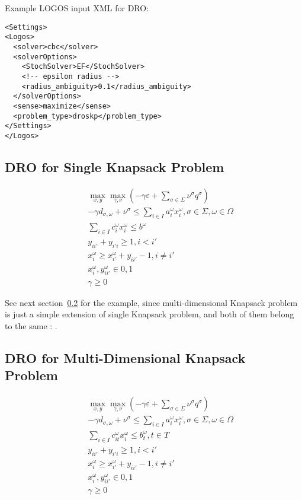 Example LOGOS input XML for DRO:
\begin{lstlisting}[style=XML]
<Settings>
<Logos>
  <solver>cbc</solver>
  <solverOptions>
    <StochSolver>EF</StochSolver>
    <!-- epsilon radius -->
    <radius_ambiguity>0.1</radius_ambiguity>
  </solverOptions>
  <sense>maximize</sense>
  <problem_type>droskp</problem_type>
</Settings>
</Logos>
\end{lstlisting}

\subsection{DRO for Single Knapsack Problem}
\label{subsec:DRO_SKP}

\vst {}
\begin{subequations}\label{DROSimpleKP}
\begin{eqnarray}
& & \max_{x, y} \max_{\gamma, \nu} (-\gamma \varepsilon + \sum_{\sigma \in \Sigma} \nu^\sigma q^\sigma)  \\
& &  -\gamma d_{\sigma, \omega} + \nu^\sigma \le \sum _{i \in I} a_{i}^{ \omega }x_{i}^{ \omega }, \sigma \in \Sigma, \omega \in \Omega \\
& & \sum_{i \in I} c_{i}^\omega x_{i}^\omega \leq b^\omega \\
& & y_{ii'} + y_{i'i} \geq 1, i<i'  \\
& & x_{i}^\omega \geq x_{i'}^\omega + y_{ii'}-1, i\neq i' \\
& & x_{i}^\omega, y_{ii'}^\omega \in {0, 1} \\
& & \gamma \ge 0
\end{eqnarray}
\end{subequations}

See next section~\ref{subsec:DRO_DKP} for the example, since multi-dimensional Knapsack problem
is just a simple extension of single Knapsack problem, and both of them belong to the same
: .


\subsection{DRO for Multi-Dimensional Knapsack Problem}
\label{subsec:DRO_DKP}

\vst {}
\begin{subequations}\label{DROMultiDKP}
\begin{eqnarray}
& & \max_{x, y} \max_{\gamma, \nu} (-\gamma \varepsilon + \sum_{\sigma \in \Sigma} \nu^\sigma q^\sigma)  \\
& &  -\gamma d_{\sigma, \omega} + \nu^\sigma \le \sum _{i \in I} a_{i}^{ \omega }x_{i}^{ \omega }, \sigma \in \Sigma, \omega \in \Omega \\
& & \sum_{i \in I} c_{it}^\omega x_{i}^\omega \leq b_{t}^\omega, t\in T \\
& & y_{ii'} + y_{i'i} \geq 1, i<i'  \\
& & x_{i}^\omega \geq x_{i'}^\omega + y_{ii'}-1, i\neq i' \\
& & x_{i}^\omega, y_{ii'}^\omega \in {0, 1} \\
& & \gamma \ge 0
\end{eqnarray}
\end{subequations}

